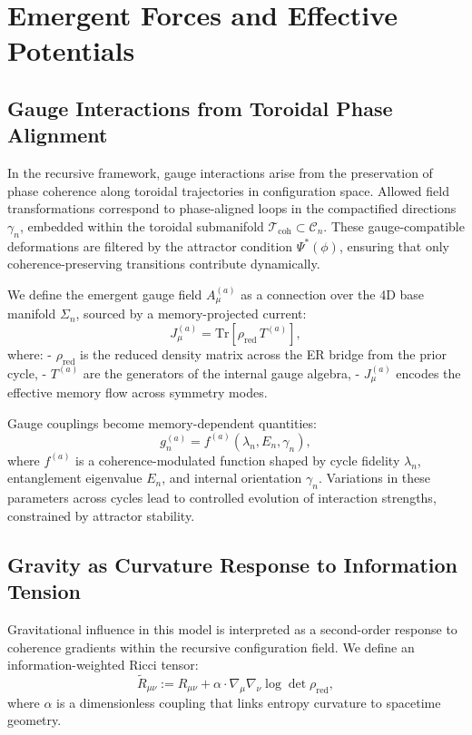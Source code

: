 \section{Emergent Forces and Effective Potentials}
\label{sec:emergent-forces}

\subsection{Gauge Interactions from Toroidal Phase Alignment}

In the recursive framework, gauge interactions arise from the preservation of phase coherence along toroidal trajectories in configuration space. Allowed field transformations correspond to phase-aligned loops in the compactified directions \( \gamma_n \), embedded within the toroidal submanifold \( \mathcal{T}_{\text{coh}} \subset \mathcal{C}_n \). These gauge-compatible deformations are filtered by the attractor condition \( \Psi^*(\phi) \), ensuring that only coherence-preserving transitions contribute dynamically.

We define the emergent gauge field \( A_\mu^{(a)} \) as a connection over the 4D base manifold \( \Sigma_n \), sourced by a memory-projected current:
\[
J_\mu^{(a)} = \mathrm{Tr}\left[ \rho_{\text{red}} \, T^{(a)} \right],
\]
where:
- \( \rho_{\text{red}} \) is the reduced density matrix across the ER bridge from the prior cycle,
- \( T^{(a)} \) are the generators of the internal gauge algebra,
- \( J_\mu^{(a)} \) encodes the effective memory flow across symmetry modes.

Gauge couplings become memory-dependent quantities:
\[
g_n^{(a)} = f^{(a)}(\lambda_n, E_n, \gamma_n),
\]
where \( f^{(a)} \) is a coherence-modulated function shaped by cycle fidelity \( \lambda_n \), entanglement eigenvalue \( E_n \), and internal orientation \( \gamma_n \). Variations in these parameters across cycles lead to controlled evolution of interaction strengths, constrained by attractor stability.

\subsection{Gravity as Curvature Response to Information Tension}

Gravitational influence in this model is interpreted as a second-order response to coherence gradients within the recursive configuration field. We define an information-weighted Ricci tensor:
\[
\widetilde{R}_{\mu\nu} := R_{\mu\nu} + \alpha \cdot \nabla_\mu \nabla_\nu \log \det \rho_{\text{red}},
\]
where \( \alpha \) is a dimensionless coupling that links entropy curvature to spacetime geometry.

